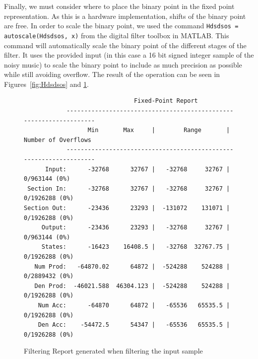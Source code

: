 \documentclass[]{article}
\begin{document}
Finally, we must consider where to place the binary point in the fixed point representation. As this is a hardware implementation, shifts of the binary point are free. In order to scale the binary point, we used the command \verb"Hdsdsos = autoscale(Hdsdsos, x)" from the digital filter toolbox in MATLAB.
This command will automatically scale the binary point of the different stages of the filter. It uses the provided input (in this case a 16 bit signed integer sample of the noisy music) to scale the binary point to include as much precision as possible while still avoiding overflow. The result of the operation can be seen in Figures~\ref{fig:Hdsdsos} and \ref{fig:fixedpoint_report}.

\begin{figure}[htbp]
	\begin{center}
		\begin{lstlisting}
                               Fixed-Point Report                                          
            -------------------------------------------------------------------
                  Min       Max     |        Range       | Number of Overflows
            -------------------------------------------------------------------
      Input:      -32768      32767 |   -32768     32767 |   0/963144 (0%)
 Section In:      -32768      32767 |   -32768     32767 |  0/1926288 (0%)
Section Out:      -23436      23293 |  -131072    131071 |  0/1926288 (0%)
     Output:      -23436      23293 |   -32768     32767 |   0/963144 (0%)
     States:      -16423    16408.5 |   -32768  32767.75 |  0/1926288 (0%)
   Num Prod:   -64870.02      64872 |  -524288    524288 |  0/2889432 (0%)
   Den Prod:  -46021.588  46304.123 |  -524288    524288 |  0/1926288 (0%)
    Num Acc:      -64870      64872 |   -65536   65535.5 |  0/1926288 (0%)
    Den Acc:    -54472.5      54347 |   -65536   65535.5 |  0/1926288 (0%)
		\end{lstlisting}
	\end{center}
	\caption{Filtering Report generated when filtering the input sample}
	\label{fig:fixedpoint_report}
\end{figure}

\end{document}
